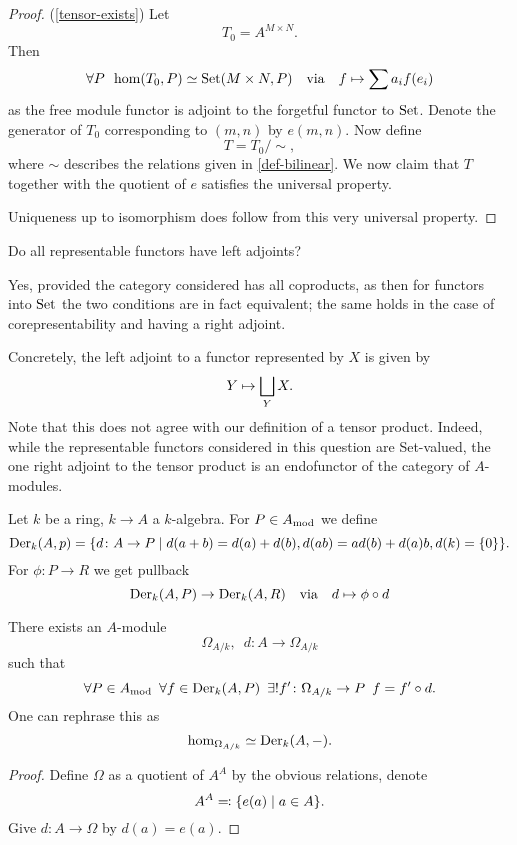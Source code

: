 \begin{proof}(\cref{tensor-exists})
  Let
  \[ T_0 = A^{M \times N}.\]
  Then
  \[ \forall P \enspace \hom(T_0, P) \simeq \text{Set}(M \times N, P) \quad \text{via} \quad  f \mapsto \sum a_i f(e_i)\]
  as the free module functor is adjoint to the forgetful functor to $\text{Set}$.
  Denote the generator of $T_0$ corresponding to $(m, n)$ by $e(m, n)$. Now define
  \[ T = T_0 / {\sim}, \]
  where $\sim$ describes the relations given in \cref{def-bilinear}.
  We now claim that $T$ together with the quotient of $e$ satisfies the universal property.

  Uniqueness up to isomorphism does follow from this very universal property.
\end{proof}

\begin{question}
  Do all representable functors have left adjoints?
\end{question}
\begin{answer}
  Yes, provided the category considered has all coproducts, as then for functors into $\text{Set}$ the two conditions are in fact equivalent; the same holds in the case of corepresentability and having a right adjoint.

  Concretely, the left adjoint to a functor represented by $X$ is given by
  \[ Y \mapsto \bigsqcup_Y X.\]
  Note that this does not agree with our definition of a tensor product. Indeed, while the representable functors considered in this question are Set-valued, the one right adjoint to the tensor product is an endofunctor of the category of $A$-modules.
\end{answer}

\begin{df}
  Let $k$ be a ring,  $k \to A$ a $k$-algebra. For $P \in A_\text{mod}$ we define
  \[ \operatorname{Der}_k(A, p) = \{ d \colon A \to P \mathrel{|} d(a+b) = d(a) + d(b), d(ab) = a d(b) + d(a) b, d(k) = \{0\} \}.\]
  For $\phi \colon P \to R$ we get pullback
  \[ \operatorname{Der}_k(A, P) \to \operatorname{Der}_k(A, R) \quad \text{via} \quad d \mapsto \phi \circ d\]
\end{df}

\begin{theorem}
  There exists an $A$-module
  \[ \Omega_{A / {k}}, \enspace d \colon A \to \Omega_{A /{k}}\]
  such that
  \[ \forall P \in A_\text{mod} \enspace \forall f \in \operatorname{Der}_k(A, P) \enspace \exists \text{!} f' \colon \Omega_{A /{k}} \to P \enspace f = f' \circ d.\]
  One can rephrase this as
  \[ \hom_{\Omega_{A/{k}}} \simeq \operatorname{Der}_k(A, -).\]
\end{theorem}
\begin{proof}
  Define $\Omega$ as a quotient of $A^A$ by the obvious relations, denote
  \[ A^A \eqqcolon \{e(a) \mathrel{|} a \in A \}.\]
  Give $d \colon A \to \Omega$ by $d(a) = e(a)$.
\end{proof}

